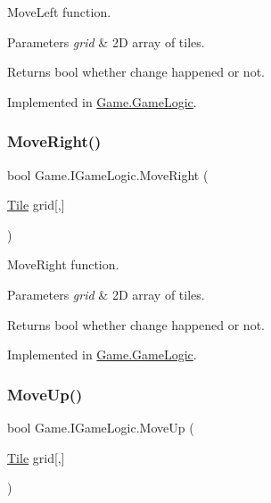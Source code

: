 Move\+Left function. 


\begin{DoxyParams}{Parameters}
{\em grid} & 2D array of tiles.\\
\hline
\end{DoxyParams}
\begin{DoxyReturn}{Returns}
bool whether change happened or not.
\end{DoxyReturn}


Implemented in \mbox{\hyperlink{class_game_1_1_game_logic_a641318ffaa89d83863f56895f09b50c5}{Game.\+Game\+Logic}}.

\mbox{\label{interface_game_1_1_i_game_logic_a7ae3b1cdeb4f6eb82ee6298bdaa05b9e}} 
\subsubsection{\texorpdfstring{MoveRight()}{MoveRight()}}
{\footnotesize\ttfamily bool Game.\+I\+Game\+Logic.\+Move\+Right (\begin{DoxyParamCaption}\item[{\mbox{\hyperlink{class_game_1_1_tile}{Tile}}}]{grid\mbox{[},\mbox{]} }\end{DoxyParamCaption})}



Move\+Right function. 


\begin{DoxyParams}{Parameters}
{\em grid} & 2D array of tiles.\\
\hline
\end{DoxyParams}
\begin{DoxyReturn}{Returns}
bool whether change happened or not.
\end{DoxyReturn}


Implemented in \mbox{\hyperlink{class_game_1_1_game_logic_ad35edbf38f3151d792d4c4cce51c4a2b}{Game.\+Game\+Logic}}.

\mbox{\label{interface_game_1_1_i_game_logic_a13ef4621073f1ad055c2c62a92411f03}} 
\subsubsection{\texorpdfstring{MoveUp()}{MoveUp()}}
{\footnotesize\ttfamily bool Game.\+I\+Game\+Logic.\+Move\+Up (\begin{DoxyParamCaption}\item[{\mbox{\hyperlink{class_game_1_1_tile}{Tile}}}]{grid\mbox{[},\mbox{]} }\end{DoxyParamCaption})}



